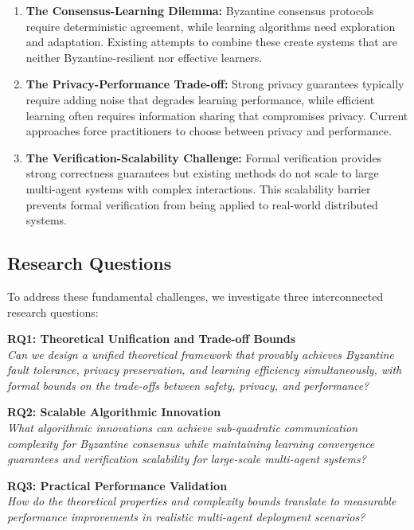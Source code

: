 \documentclass[conference]{IEEEtran}
\begin{document}
\begin{enumerate}
    \item \textbf{The Consensus-Learning Dilemma:} Byzantine consensus protocols require deterministic agreement, while learning algorithms need exploration and adaptation. Existing attempts to combine these create systems that are neither Byzantine-resilient nor effective learners.
    
    \item \textbf{The Privacy-Performance Trade-off:} Strong privacy guarantees typically require adding noise that degrades learning performance, while efficient learning often requires information sharing that compromises privacy. Current approaches force practitioners to choose between privacy and performance.
    
    \item \textbf{The Verification-Scalability Challenge:} Formal verification provides strong correctness guarantees but existing methods do not scale to large multi-agent systems with complex interactions. This scalability barrier prevents formal verification from being applied to real-world distributed systems.
\end{enumerate}

\subsection{Research Questions}

To address these fundamental challenges, we investigate three interconnected research questions:

\textbf{RQ1: Theoretical Unification and Trade-off Bounds}\\
\textit{Can we design a unified theoretical framework that provably achieves Byzantine fault tolerance, privacy preservation, and learning efficiency simultaneously, with formal bounds on the trade-offs between safety, privacy, and performance?}

\textbf{RQ2: Scalable Algorithmic Innovation}\\
\textit{What algorithmic innovations can achieve sub-quadratic communication complexity for Byzantine consensus while maintaining learning convergence guarantees and verification scalability for large-scale multi-agent systems?}

\textbf{RQ3: Practical Performance Validation}\\
\textit{How do the theoretical properties and complexity bounds translate to measurable performance improvements in realistic multi-agent deployment scenarios?}
\end{document}
